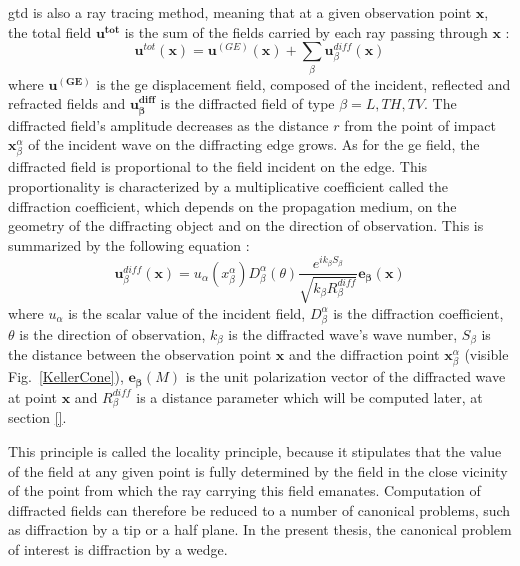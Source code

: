 \acrshort{gtd} is also a ray tracing method, meaning that at a given observation point $\mathbf{x}$, the total field $\mathbf{u^{tot}}$ is the sum of the fields carried by each ray passing through $\mathbf{x}$ :
\begin{equation}
    \mathbf{u}^{tot}(\mathbf{x})=\mathbf{u}^{(GE)}(\mathbf{x})+\sum_{\beta} \mathbf{u}^{diff}_{\beta}(\mathbf{x})
    \label{GTDtot}
\end{equation}
where $\mathbf{u^{(GE)}}$ is the \acrshort{ge} displacement field, composed of the incident, reflected and refracted fields and $\mathbf{u^{diff}_{\beta}}$ is the diffracted field of type $\beta=L,TH,TV$. The diffracted field's amplitude decreases as the distance $r$ from the point of impact $\mathbf{x}_{\beta}^{\alpha}$ of the incident wave on the diffracting edge grows. As for the \acrshort{ge} field, the diffracted field is proportional to the field incident on the edge. This proportionality is characterized by a multiplicative coefficient called the diffraction coefficient, which depends on the propagation medium, on the geometry of the diffracting object and on the direction of observation. This is summarized by the following equation :
\begin{equation}
    \mathbf{u}_{\beta}^{diff}(\mathbf{x})=u_{\alpha}(x_{\beta}^{\alpha})D_{\beta}^{\alpha}(\theta)\dfrac{e^{ik_{\beta}S_{\beta}}}{\sqrt{k_{\beta}R_{\beta}^{diff}}}\mathbf{e_{\beta}}(\mathbf{x})
    \label{C1:GTDdiff}
\end{equation}
where $u_{\alpha}$ is the scalar value of the incident field, $D_{\beta}^{\alpha}$ is the diffraction coefficient, $\theta$ is the direction of observation, $k_{\beta}$ is the diffracted wave's wave number, $S_{\beta}$ is the distance between the observation point $\mathbf{x}$ and the diffraction point $\mathbf{x}_{\beta}^{\alpha}$ (visible Fig.~\ref{KellerCone}), $\mathbf{e_{\beta}}(M)$ is the unit polarization vector of the diffracted wave at point $\mathbf{x}$ and $R_{\beta}^{diff}$ is a distance parameter which will be computed later, at section \ref{}.

This principle is called the locality principle, because it stipulates that the value of the field at any given point is fully determined by the field in the close vicinity of the point from which the ray carrying this field emanates. Computation of diffracted fields can therefore be reduced to a number of canonical problems, such as diffraction by a tip or a half plane. In the present thesis, the canonical problem of interest is diffraction by a wedge.

